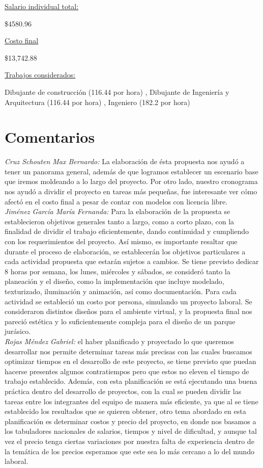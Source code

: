 \documentclass[12pt]{article} %
\begin{document}
	\underline{Salario individual total:}
	
	\$4580.96
	
	\underline{Costo final}
	
	\$13,742.88
	
	\underline{Trabajos considerados:}
	
	Dibujante de construcción 
	\color{gray}(116.44 por hora)\color{black}
	, Dibujante de Ingeniería y Arquitectura 
	\color{gray}(116.44 por hora)\color{black}
	, Ingeniero 
	\color{gray}(182.2 por hora)\color{black}	
	
	\section{Comentarios}
 	
	\emph{Cruz Schouten Max Bernardo:}
	La elaboración de ésta propuesta nos ayudó a tener un panorama general, además de que logramos establecer un escenario 
	base que iremos moldeando a lo largo del proyecto. Por otro lado, nuestro cronograma nos ayudó a dividir el proyecto en 
	tareas más pequeñas, fue interesante ver cómo afectó en el costo final a pesar de contar con modelos con licencia libre.
	\\
	
	\emph{Jiménez García María Fernanda:}
	Para la elaboración de la propuesta se establecieron objetivos generales tanto a largo, como a corto plazo, con la 
	finalidad de dividir el trabajo eficientemente, dando continuidad y cumpliendo con los requerimientos del proyecto. 
	Así mismo, es importante resaltar que durante el proceso de elaboración, se establecerán los objetivos particulares a 
	cada actividad propuesta que estarán sujetos a cambios. Se tiene previsto dedicar 8 horas por semana,  los lunes, 
	miércoles y sábados, se consideró tanto la planeación y el diseño, como la implementación que incluye modelado, 
	texturizado, iluminación y animación, así como documentación. Para cada actividad se estableció un costo por persona, 
	simulando un proyecto laboral. Se consideraron distintos diseños para el ambiente virtual, y la propuesta final nos pareció 
	estética y lo suficientemente compleja para el diseño de un parque jurásico.
	\\
	
	\emph{Rojas Méndez Gabriel:}
	el haber planificado y proyectado lo que queremos desarrollar nos permite determinar tareas más precisas con las cuales 
	buscamos optimizar tiempos en el desarrollo de este proyecto, se tiene previsto que puedan hacerse presentes algunos 
	contratiempos pero que estos no eleven el tiempo de trabajo establecido. Además, con esta planificación se está ejecutando 
	una buena práctica dentro del desarrollo de proyectos, con la cual se pueden dividir las tareas entre los integrantes del 
	equipo de manera más eficiente, ya que al se tiene establecido los resultados que se quieren obtener, otro tema abordado en 
	esta planificación es determinar costos y precio del proyecto, en donde nos basamos a los tabuladores nacionales de salarios, 
	tiempos y nivel de dificultad, y aunque tal vez el precio tenga ciertas variaciones por nuestra falta de experiencia dentro 
	de la temática de los precios esperamos que este sea lo más cercano a lo del mundo laboral.
 	
\end{document}
